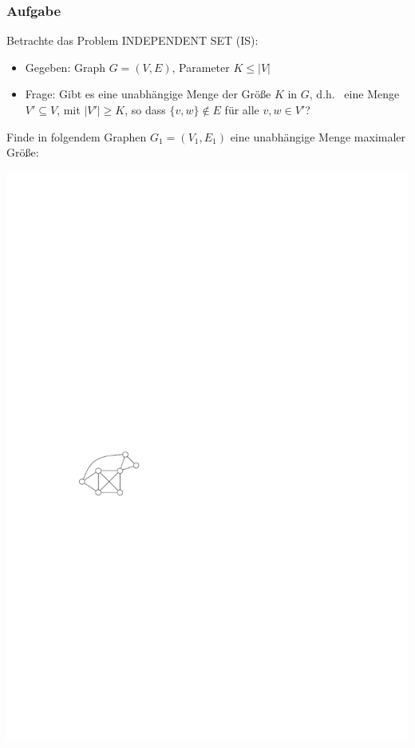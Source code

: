 \begin{frame}
\frametitle{Aufgabe}
Betrachte das Problem INDEPENDENT SET (IS):

\begin{itemize}
 \item Gegeben: Graph $G=(V, E)$, Parameter $K \leq |V|$
 \item Frage: Gibt es eine unabhängige Menge der Größe $K$ in $G$, d.h.~ eine Menge $V' \subseteq V$, mit $|V'| \geq K$, so dass $\{v, w\} \notin E$ für alle $v, w \in V'$? 
\end{itemize}

 {

Finde in folgendem Graphen $G_1 = (V_1, E_1)$ eine unabhängige Menge maximaler Größe:

\begin{center}\includegraphics[scale=1.5]{images/tut7-graph}\end{center}

}
\end{frame}
